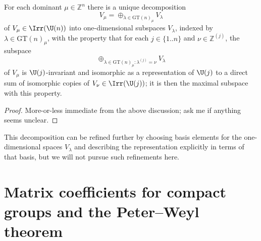 \documentclass[reqno]{amsart} 
\begin{document}
\begin{theorem}
  For each dominant $\mu \in \mathbb{Z}^n$ there is a unique decomposition
  \begin{equation*}
    V_\mu = \oplus_{\lambda \in \mathrm{GT}(n)_\mu} V_\lambda
  \end{equation*}
  of $V_\mu \in \Irr(\U(n))$ into one-dimensional subspaces $V_\lambda$, indexed by $\lambda \in \mathrm{GT}(n)_\mu$, with the property that for each $j \in \{1..n\}$ and $\nu \in \mathbb{Z}^{(j)}$, the subspace
  \begin{equation*}
    \oplus_{\lambda \in \mathrm{GT}(n)_\mu : \lambda^{(j)} = \nu} V_\lambda
  \end{equation*}
  of $V_\mu$ is $\U(j)$-invariant and isomorphic as a representation of $\U(j)$ to a direct sum of isomorphic copies of $V_\nu \in \Irr(\U(j))$; it is then the maximal subspace with this property.
\end{theorem}
\begin{proof}
  More-or-less immediate from the above discussion; ask me if anything seems unclear.
\end{proof}
This decomposition can be refined further by choosing basis elements for the one-dimensional spaces $V_\lambda$ and describing the representation explicitly in terms of that basis, but we will not pursue such refinements here.


\newpage


\section{Matrix coefficients for compact groups and the Peter--Weyl theorem}
\end{document}

